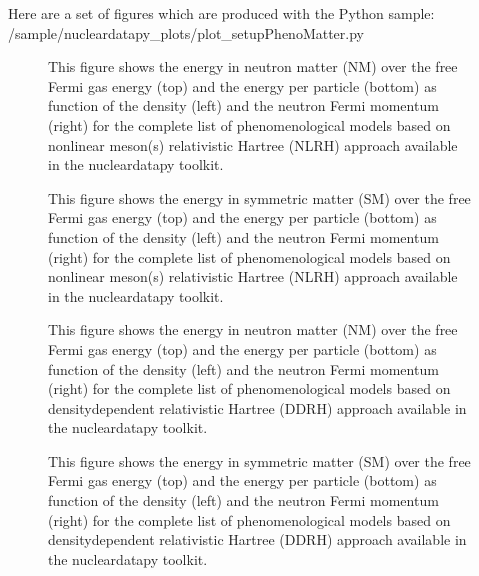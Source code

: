 \documentclass[letterpaper,10pt,english]{sphinxmanual}
\begin{document}
\sphinxAtStartPar
Here are a set of figures which are produced with the Python sample: /sample/nucleardatapy\_plots/plot\_setupPhenoMatter.py

\begin{figure}[htbp]
\centering
\capstart

\noindent{}
\caption{This figure shows the energy in neutron matter (NM) over the free Fermi gas energy (top) and the energy per particle (bottom) as function of the density (left) and the neutron Fermi momentum (right) for the complete list of phenomenological models based on non\sphinxhyphen{}linear meson(s) relativistic Hartree (NLRH) approach available in the nucleardatapy toolkit.}\label{\detokenize{source/api/setup_pheno_matter:id1}}\end{figure}

\begin{figure}[htbp]
\centering
\capstart

\noindent{}
\caption{This figure shows the energy in symmetric matter (SM) over the free Fermi gas energy (top) and the energy per particle (bottom) as function of the density (left) and the neutron Fermi momentum (right) for the complete list of phenomenological models based on non\sphinxhyphen{}linear meson(s) relativistic Hartree (NLRH) approach available in the nucleardatapy toolkit.}\label{\detokenize{source/api/setup_pheno_matter:id2}}\end{figure}

\begin{figure}[htbp]
\centering
\capstart

\noindent{}
\caption{This figure shows the energy in neutron matter (NM) over the free Fermi gas energy (top) and the energy per particle (bottom) as function of the density (left) and the neutron Fermi momentum (right) for the complete list of phenomenological models based on density\sphinxhyphen{}dependent relativistic Hartree (DDRH) approach available in the nucleardatapy toolkit.}\label{\detokenize{source/api/setup_pheno_matter:id3}}\end{figure}

\begin{figure}[htbp]
\centering
\capstart

\noindent{}
\caption{This figure shows the energy in symmetric matter (SM) over the free Fermi gas energy (top) and the energy per particle (bottom) as function of the density (left) and the neutron Fermi momentum (right) for the complete list of phenomenological models based on density\sphinxhyphen{}dependent relativistic Hartree (DDRH) approach available in the nucleardatapy toolkit.}\label{\detokenize{source/api/setup_pheno_matter:id4}}\end{figure}
\end{document}
